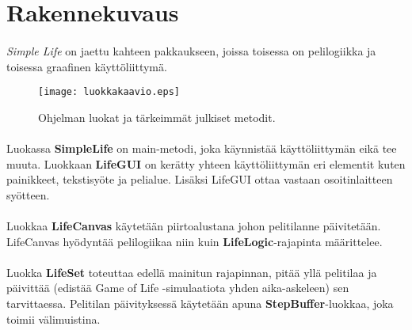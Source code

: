 \documentclass[11pt]{article}
\begin{document}
\section{Rakennekuvaus}

\paragraph{} \textit{Simple Life} on jaettu kahteen pakkaukseen, joissa toisessa on pelilogiikka ja toisessa graafinen käyttöliittymä.

\begin{figure}[h]
\texttt{[image: luokkakaavio.eps]}
\caption{Ohjelman luokat ja tärkeimmät julkiset metodit.}
\end{figure}

\paragraph{} Luokassa \textbf{SimpleLife} on main-metodi, joka käynnistää käyttöliittymän eikä tee muuta. Luokkaan \textbf{LifeGUI} on kerätty yhteen käyttöliittymän eri elementit kuten painikkeet, tekstisyöte ja pelialue. Lisäksi LifeGUI ottaa vastaan osoitinlaitteen syötteen.

\paragraph{} Luokkaa \textbf{LifeCanvas} käytetään piirtoalustana johon pelitilanne päivitetään. LifeCanvas hyödyntää pelilogiikaa niin kuin \textbf{LifeLogic}-rajapinta määrittelee.

\paragraph{} Luokka \textbf{LifeSet} toteuttaa edellä mainitun rajapinnan, pitää yllä pelitilaa ja päivittää (edistää Game of Life -simulaatiota yhden aika-askeleen) sen tarvittaessa. Pelitilan päivityksessä käytetään apuna \textbf{StepBuffer}-luokkaa, joka toimii välimuistina.
\end{document}

